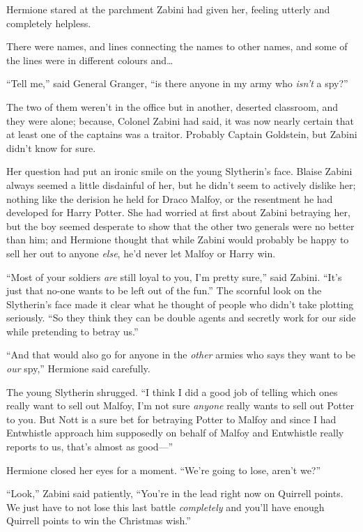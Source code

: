 Hermione stared at the parchment Zabini had given her, feeling utterly and completely helpless.

There were names, and lines connecting the names to other names, and some of the lines were in different colours and…

“Tell me,” said General Granger, “is there anyone in my army who \emph{isn’t} a spy?”

The two of them weren’t in the office but in another, deserted classroom, and they were alone; because, Colonel Zabini had said, it was now nearly certain that at least one of the captains was a traitor. Probably Captain Goldstein, but Zabini didn’t know for sure.

Her question had put an ironic smile on the young Slytherin’s face. Blaise Zabini always seemed a little disdainful of her, but he didn’t seem to actively dislike her; nothing like the derision he held for Draco Malfoy, or the resentment he had developed for Harry Potter. She had worried at first about Zabini betraying her, but the boy seemed desperate to show that the other two generals were no better than him; and Hermione thought that while Zabini would probably be happy to sell her out to anyone \emph{else}, he’d never let Malfoy or Harry win.

“Most of your soldiers \emph{are} still loyal to you, I’m pretty sure,” said Zabini. “It’s just that no-one wants to be left out of the fun.” The scornful look on the Slytherin’s face made it clear what he thought of people who didn’t take plotting seriously. “So they think they can be double agents and secretly work for our side while pretending to betray us.”

“And that would also go for anyone in the \emph{other} armies who says they want to be \emph{our} spy,” Hermione said carefully.

The young Slytherin shrugged. “I think I did a good job of telling which ones really want to sell out Malfoy, I’m not sure \emph{anyone} really wants to sell out Potter to you. But Nott is a sure bet for betraying Potter to Malfoy and since I had Entwhistle approach him supposedly on behalf of Malfoy and Entwhistle really reports to us, that’s almost as good—”

Hermione closed her eyes for a moment. “We’re going to lose, aren’t we?”

“Look,” Zabini said patiently, “You’re in the lead right now on Quirrell points. We just have to not lose this last battle \emph{completely} and you’ll have enough Quirrell points to win the Christmas wish.”

